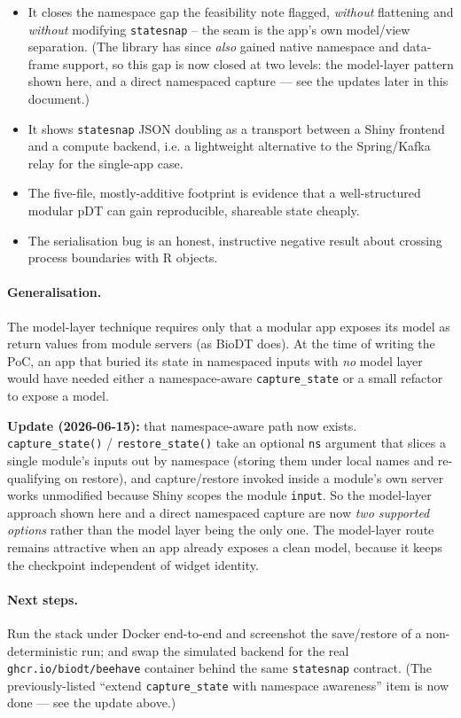 \documentclass[12pt,a4paper]{article}
\begin{document}
\begin{itemize}[nosep]
  \item It closes the namespace gap the feasibility note flagged, \emph{without}
    flattening and \emph{without} modifying \texttt{statesnap} -- the seam is the
    app's own model/view separation. (The library has since \emph{also} gained
    native namespace and data-frame support, so this gap is now closed at two
    levels: the model-layer pattern shown here, and a direct namespaced capture
    --- see the updates later in this document.)
  \item It shows \texttt{statesnap} JSON doubling as a transport between a Shiny
    frontend and a compute backend, i.e. a lightweight alternative to the
    Spring/Kafka relay for the single-app case.
  \item The five-file, mostly-additive footprint is evidence that a
    well-structured modular pDT can gain reproducible, shareable state cheaply.
  \item The serialisation bug is an honest, instructive negative result about
    crossing process boundaries with R objects.
\end{itemize}

\paragraph{Generalisation.} The model-layer technique requires only that a
modular app exposes its model as return values from module servers (as BioDT
does). At the time of writing the PoC, an app that buried its state in namespaced
inputs with \emph{no} model layer would have needed either a namespace-aware
\texttt{capture\_state} or a small refactor to expose a model.

\noindent\textbf{Update (2026-06-15):} that namespace-aware path now exists.
\texttt{capture\_state()} / \texttt{restore\_state()} take an optional \texttt{ns}
argument that slices a single module's inputs out by namespace (storing them
under local names and re-qualifying on restore), and capture/restore invoked
inside a module's own server works unmodified because Shiny scopes the module
\texttt{input}. So the model-layer approach shown here and a direct namespaced
capture are now \emph{two supported options} rather than the model layer being the
only one. The model-layer route remains attractive when an app already exposes a
clean model, because it keeps the checkpoint independent of widget identity.

\paragraph{Next steps.} Run the stack under Docker end-to-end and screenshot the
save/restore of a non-deterministic run; and swap the simulated backend for the
real \texttt{ghcr.io/biodt/beehave} container behind the same \texttt{statesnap}
contract. (The previously-listed ``extend \texttt{capture\_state} with namespace
awareness'' item is now done --- see the update above.)
\end{document}
